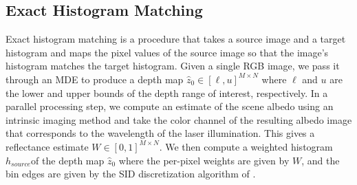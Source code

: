 %


\subsection{Exact Histogram Matching}
%  
Exact histogram matching is a procedure that takes a source image and a target
histogram and maps the pixel values of the source image so that the image's
histogram matches the target histogram. Given a single RGB image, we pass it
through an MDE to produce a depth map $\hat z_0 \in [\ell, u]^{M \times N}$
where $\ell$ and $u$ are the lower and upper bounds of the depth range of
interest, respectively. In a parallel processing step,
we compute an estimate of the scene albedo using an intrinsic imaging method and
take the color channel of the resulting albedo image that corresponds to the
wavelength of the laser illumination. This gives a reflectance estimate $W \in
[0, 1]^{M \times N}$. We
then compute a weighted histogram $h_{source}$of the depth map $\hat z_0$ where the
per-pixel weights are given by $W$, and the bin edges are given by the SID
discretization algorithm of \cite{Fu2018}.

